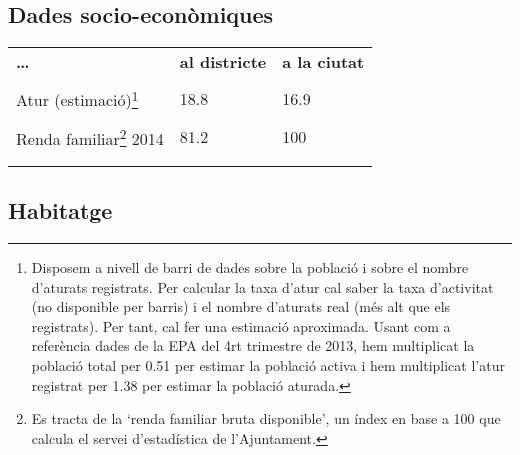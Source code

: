 \documentclass[]{article}
\begin{document}
\subsection{Dades socio-econòmiques}\label{dades-socio-economiques}

\begin{longtable}[c]{@{}lll@{}}
\toprule\addlinespace
\textbf{\ldots{}} & \textbf{al districte} & \textbf{a la ciutat}
\\\addlinespace
\midrule\endhead
\\\addlinespace
Atur (estimació)\footnote{Disposem a nivell de barri de dades sobre la
  població i sobre el nombre d'aturats registrats. Per calcular la taxa
  d'atur cal saber la taxa d'activitat (no disponible per barris) i el
  nombre d'aturats real (més alt que els registrats). Per tant, cal fer
  una estimació aproximada. Usant com a referència dades de la EPA del
  4rt trimestre de 2013, hem multiplicat la població total per 0.51 per
  estimar la població activa i hem multiplicat l'atur registrat per 1.38
  per estimar la població aturada.} & 18.8 & 16.9
\\\addlinespace
\\\addlinespace
Renda familiar\footnote{Es tracta de la `renda familiar bruta
  disponible', un índex en base a 100 que calcula el servei
  d'estadística de l'Ajuntament.} 2014 & 81.2 & 100
\\\addlinespace
\\\addlinespace
\bottomrule
\end{longtable}

\subsection{Habitatge}\label{habitatge}
\end{document}
